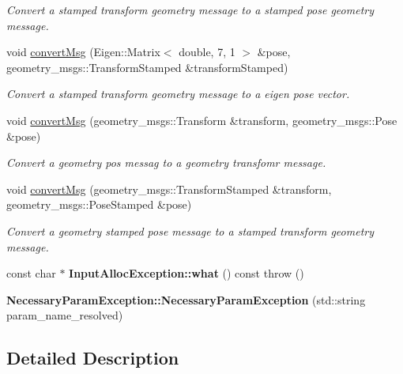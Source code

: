 \begin{DoxyCompactItemize}
\begin{DoxyCompactList}\small\item\em Convert a stamped transform geometry message to a stamped pose geometry message. \end{DoxyCompactList}\item 
void \hyperlink{group__multi__robot__controller_ga21e894dfe1e1216355db06776a630b09}{convert\+Msg} (Eigen\+::\+Matrix$<$ double, 7, 1 $>$ \&pose, geometry\+\_\+msgs\+::\+Transform\+Stamped \&transform\+Stamped)
\begin{DoxyCompactList}\small\item\em Convert a stamped transform geometry message to a eigen pose vector. \end{DoxyCompactList}\item 
void \hyperlink{group__multi__robot__controller_ga27bedbf17c4aa6e228239ef1f1009e2b}{convert\+Msg} (geometry\+\_\+msgs\+::\+Transform \&transform, geometry\+\_\+msgs\+::\+Pose \&pose)
\begin{DoxyCompactList}\small\item\em Convert a geometry pos messag to a geometry transfomr message. \end{DoxyCompactList}\item 
void \hyperlink{group__multi__robot__controller_ga83f417b8e164774e4926508549543498}{convert\+Msg} (geometry\+\_\+msgs\+::\+Transform\+Stamped \&transform, geometry\+\_\+msgs\+::\+Pose\+Stamped \&pose)
\begin{DoxyCompactList}\small\item\em Convert a geometry stamped pose message to a stamped transform geometry message. \end{DoxyCompactList}\item 
\mbox{\label{group__multi__robot__controller_gaa948b5d25acee95c1d39f1e1276304b8}} 
const char $\ast$ {\bfseries Input\+Alloc\+Exception\+::what} () const  throw ()
\item 
\mbox{\label{group__multi__robot__controller_ga7c6066c92d689e7946e49425c2efef62}} 
{\bfseries Necessary\+Param\+Exception\+::\+Necessary\+Param\+Exception} (std\+::string param\+\_\+name\+\_\+resolved)
\end{DoxyCompactItemize}


\subsection{Detailed Description}


